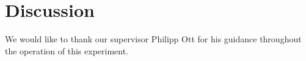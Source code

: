 \documentclass[twocolumn,
			   showpacs,%
               nofootinbib,
               aps,%
               prd,
               notitlepage,
               showkeys,
               10pt]{revtex4-1}
\begin{document}
\section{Discussion}

\Blindtext


\begin{acknowledgments}

We would like to thank our supervisor Philipp Ott for his guidance throughout the operation of this experiment.

\end{acknowledgments}



\nocite{*}
\end{document}
